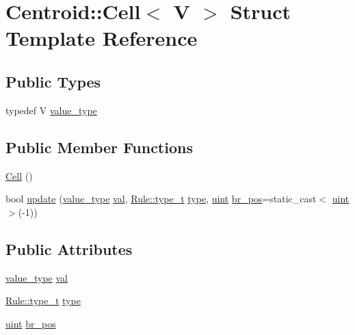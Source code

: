 \hypertarget{struct_centroid_1_1_cell}{\section{Centroid\+:\+:Cell$<$ V $>$ Struct Template Reference}
\label{struct_centroid_1_1_cell}
}
\subsection*{Public Types}
\begin{DoxyCompactItemize}
\item 
typedef V \hyperlink{struct_centroid_1_1_cell_a94d1eacb4f16e28d4d5df12ee8102ab4}{value\+\_\+type}
\end{DoxyCompactItemize}
\subsection*{Public Member Functions}
\begin{DoxyCompactItemize}
\item 
\hyperlink{struct_centroid_1_1_cell_afc3bdeb541fa11337a4c875b24d9d5a3}{Cell} ()
\item 
bool \hyperlink{struct_centroid_1_1_cell_a598f2a5534f486e5926e7e14ca65fb4d}{update} (\hyperlink{struct_centroid_1_1_cell_a94d1eacb4f16e28d4d5df12ee8102ab4}{value\+\_\+type} \hyperlink{struct_centroid_1_1_cell_ab9c512795d366466b23ea0e0c84535aa}{val}, \hyperlink{namespace_rule_a19cb2a2fcfb640a8dce289e3d476923d}{Rule\+::type\+\_\+t} \hyperlink{struct_centroid_1_1_cell_a6d7372093392e6fcbb30e071b97ba2d8}{type}, \hyperlink{cyktable_8h_a91ad9478d81a7aaf2593e8d9c3d06a14}{uint} \hyperlink{struct_centroid_1_1_cell_affe918e74597921889f056a4566ee9d6}{br\+\_\+pos}=static\+\_\+cast$<$ \hyperlink{cyktable_8h_a91ad9478d81a7aaf2593e8d9c3d06a14}{uint} $>$(-\/1))
\end{DoxyCompactItemize}
\subsection*{Public Attributes}
\begin{DoxyCompactItemize}
\item 
\hyperlink{struct_centroid_1_1_cell_a94d1eacb4f16e28d4d5df12ee8102ab4}{value\+\_\+type} \hyperlink{struct_centroid_1_1_cell_ab9c512795d366466b23ea0e0c84535aa}{val}
\item 
\hyperlink{namespace_rule_a19cb2a2fcfb640a8dce289e3d476923d}{Rule\+::type\+\_\+t} \hyperlink{struct_centroid_1_1_cell_a6d7372093392e6fcbb30e071b97ba2d8}{type}
\item 
\hyperlink{cyktable_8h_a91ad9478d81a7aaf2593e8d9c3d06a14}{uint} \hyperlink{struct_centroid_1_1_cell_affe918e74597921889f056a4566ee9d6}{br\+\_\+pos}
\end{DoxyCompactItemize}


